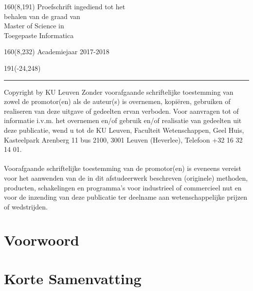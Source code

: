 \documentclass[12pt,a4paper,oneside]{book}
\theoremstyle{definition}
\begin{document}
%
\begin{textblock}{160}(8,191)
\textblockcolour{}
\vspace{-\parskip}
\flushright
Proefschrift ingediend tot het\\[4.5pt]
behalen van de graad van\\[4.5pt]
Master of Science in\\[4.5pt]
Toegepaste Informatica\\
\end{textblock}
%
\begin{textblock}{160}(8,232)
\textblockcolour{}
\vspace{-\parskip}
\flushright
Academiejaar 2017-2018
\end{textblock}
%
\begin{textblock}{191}(-24,248)
{\color{blueline}\rule{550pt}{5.5pt}}
\end{textblock}
%
\vfill
\newpage
\thispagestyle{empty}
\textsf{\textcopyright} Copyright by KU Leuven
Zonder voorafgaande schriftelijke toestemming van zowel de promotor(en) als de auteur(s) is overnemen, kopiëren, gebruiken of realiseren van deze uitgave of gedeelten ervan verboden. Voor aanvragen tot of informatie i.v.m. het overnemen en/of gebruik en/of realisatie van gedeelten uit deze publicatie, wend u tot de KU Leuven, Faculteit Wetenschappen, Geel Huis, Kasteelpark Arenberg 11 bus 2100, 3001 Leuven (Heverlee), Telefoon +32 16 32 14 01.
\\\\
Voorafgaande schriftelijke toestemming van de promotor(en) is eveneens vereist voor het aanwenden van de in dit afstudeerwerk beschreven (originele) methoden, producten, schakelingen en programma’s voor industrieel of commercieel nut en voor de inzending van deze publicatie ter deelname aan wetenschappelijke prijzen of wedstrijden.

\vfill
\newpage

\rmfamily
\setcounter{page}{0}
\frontmatter
\chapter{Voorwoord}
\chapter{Korte Samenvatting}
\end{document}
